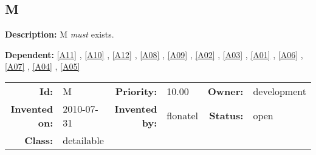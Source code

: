 \subsection{M}\label{M}
\textbf{Description:} M \textsl{must} exists.

\textbf{Dependent:} \ref{A11} , \ref{A10} , \ref{A12} , \ref{A08} , \ref{A09} , \ref{A02} , \ref{A03} , \ref{A01} , \ref{A06} , \ref{A07} , \ref{A04} , \ref{A05} 

\par
{\small \begin{center}\begin{tabular}{rlrlrl}
\textbf{Id:} & M  & \textbf{Priority:} & 10.00  & \textbf{Owner:} & development\\ 
\textbf{Invented on:} & 2010-07-31  & \textbf{Invented by:} & flonatel  & \textbf{Status:} & open \\ 
\textbf{Class:} & detailable  & & & \end{tabular}\end{center} }
